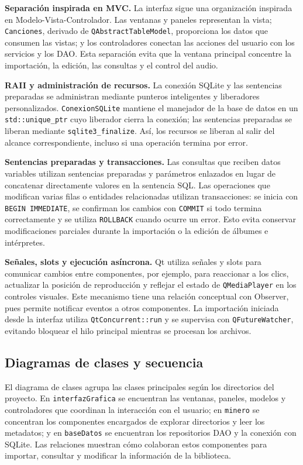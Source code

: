 \documentclass[10pt,a4paper]{article}
\begin{document}
\textbf{Separación inspirada en MVC.} La interfaz sigue una organización inspirada en Modelo-Vista-Controlador. Las ventanas y paneles representan la vista; \texttt{Canciones}, derivado de \texttt{QAbstractTableModel}, proporciona los datos que consumen las vistas; y los controladores conectan las acciones del usuario con los servicios y los DAO. Esta separación evita que la ventana principal concentre la importación, la edición, las consultas y el control del audio.

\textbf{RAII y administración de recursos.} La conexión SQLite y las sentencias preparadas se administran mediante punteros inteligentes y liberadores personalizados. \texttt{ConexionSQLite} mantiene el manejador de la base de datos en un \texttt{std::unique\_ptr} cuyo liberador cierra la conexión; las sentencias preparadas se liberan mediante \texttt{sqlite3\_finalize}. Así, los recursos se liberan al salir del alcance correspondiente, incluso si una operación termina por error.

\textbf{Sentencias preparadas y transacciones.} Las consultas que reciben datos variables utilizan sentencias preparadas y parámetros enlazados en lugar de concatenar directamente valores en la sentencia SQL. Las operaciones que modifican varias filas o entidades relacionadas utilizan transacciones: se inicia con \texttt{BEGIN IMMEDIATE}, se confirman los cambios con \texttt{COMMIT} si todo termina correctamente y se utiliza \texttt{ROLLBACK} cuando ocurre un error. Esto evita conservar modificaciones parciales durante la importación o la edición de álbumes e intérpretes.

\textbf{Señales, slots y ejecución asíncrona.} Qt utiliza señales y slots para comunicar cambios entre componentes, por ejemplo, para reaccionar a los clics, actualizar la posición de reproducción y reflejar el estado de \texttt{QMediaPlayer} en los controles visuales. Este mecanismo tiene una relación conceptual con Observer, pues permite notificar eventos a otros componentes. La importación iniciada desde la interfaz utiliza \texttt{QtConcurrent::run} y se supervisa con \texttt{QFutureWatcher}, evitando bloquear el hilo principal mientras se procesan los archivos.

\subsection{Diagramas de clases y secuencia}
El diagrama de clases agrupa las clases principales según los directorios del proyecto. En \texttt{interfazGrafica} se encuentran las ventanas, paneles, modelos y controladores que coordinan la interacción con el usuario; en \texttt{minero} se concentran los componentes encargados de explorar directorios y leer los metadatos; y en \texttt{baseDatos} se encuentran los repositorios DAO y la conexión con SQLite. Las relaciones muestran cómo colaboran estos componentes para importar, consultar y modificar la información de la biblioteca.
\end{document}
